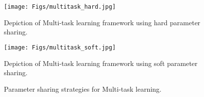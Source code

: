 \begin{figure}
 \centering
 \begin{minipage}{0.5\linewidth}
   \centering
   \texttt{[image: Figs/multitask\_hard.jpg]}
   \caption{Depiction of Multi-task learning framework using hard parameter sharing.}
   \label{fig:mtl_hard}
 \end{minipage}
 \begin{minipage}{0.5\linewidth}
   \centering
    \texttt{[image: Figs/multitask\_soft.jpg]}
   \caption{Depiction of Multi-task learning framework using soft parameter sharing.}
   \label{fig:mtl_soft}
 \end{minipage}
 \caption{Parameter sharing strategies for Multi-task learning.}
 \label{fig:mtl_types}
\end{figure}

